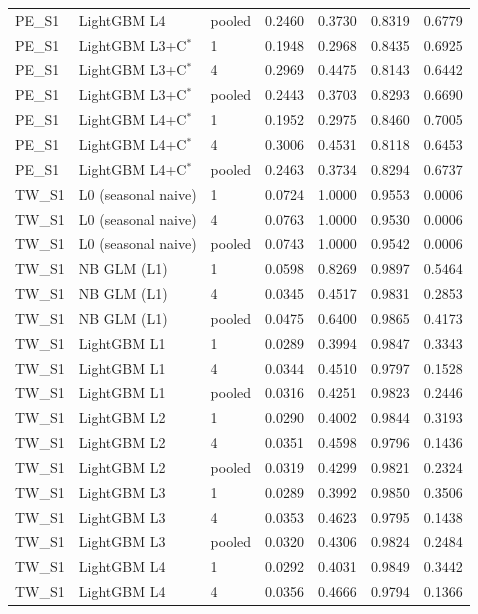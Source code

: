 \begin{tabular}{lllrrrr}
PE\_S1 & LightGBM L4 & pooled & 0.2460 & 0.3730 & 0.8319 & 0.6779 \\
PE\_S1 & LightGBM L3+C$^{*}$ & 1 & 0.1948 & 0.2968 & 0.8435 & 0.6925 \\
PE\_S1 & LightGBM L3+C$^{*}$ & 4 & 0.2969 & 0.4475 & 0.8143 & 0.6442 \\
PE\_S1 & LightGBM L3+C$^{*}$ & pooled & 0.2443 & 0.3703 & 0.8293 & 0.6690 \\
PE\_S1 & LightGBM L4+C$^{*}$ & 1 & 0.1952 & 0.2975 & 0.8460 & 0.7005 \\
PE\_S1 & LightGBM L4+C$^{*}$ & 4 & 0.3006 & 0.4531 & 0.8118 & 0.6453 \\
PE\_S1 & LightGBM L4+C$^{*}$ & pooled & 0.2463 & 0.3734 & 0.8294 & 0.6737 \\
TW\_S1 & L0 (seasonal naive) & 1 & 0.0724 & 1.0000 & 0.9553 & 0.0006 \\
TW\_S1 & L0 (seasonal naive) & 4 & 0.0763 & 1.0000 & 0.9530 & 0.0006 \\
TW\_S1 & L0 (seasonal naive) & pooled & 0.0743 & 1.0000 & 0.9542 & 0.0006 \\
TW\_S1 & NB GLM (L1) & 1 & 0.0598 & 0.8269 & 0.9897 & 0.5464 \\
TW\_S1 & NB GLM (L1) & 4 & 0.0345 & 0.4517 & 0.9831 & 0.2853 \\
TW\_S1 & NB GLM (L1) & pooled & 0.0475 & 0.6400 & 0.9865 & 0.4173 \\
TW\_S1 & LightGBM L1 & 1 & 0.0289 & 0.3994 & 0.9847 & 0.3343 \\
TW\_S1 & LightGBM L1 & 4 & 0.0344 & 0.4510 & 0.9797 & 0.1528 \\
TW\_S1 & LightGBM L1 & pooled & 0.0316 & 0.4251 & 0.9823 & 0.2446 \\
TW\_S1 & LightGBM L2 & 1 & 0.0290 & 0.4002 & 0.9844 & 0.3193 \\
TW\_S1 & LightGBM L2 & 4 & 0.0351 & 0.4598 & 0.9796 & 0.1436 \\
TW\_S1 & LightGBM L2 & pooled & 0.0319 & 0.4299 & 0.9821 & 0.2324 \\
TW\_S1 & LightGBM L3 & 1 & 0.0289 & 0.3992 & 0.9850 & 0.3506 \\
TW\_S1 & LightGBM L3 & 4 & 0.0353 & 0.4623 & 0.9795 & 0.1438 \\
TW\_S1 & LightGBM L3 & pooled & 0.0320 & 0.4306 & 0.9824 & 0.2484 \\
TW\_S1 & LightGBM L4 & 1 & 0.0292 & 0.4031 & 0.9849 & 0.3442 \\
TW\_S1 & LightGBM L4 & 4 & 0.0356 & 0.4666 & 0.9794 & 0.1366 \\

\end{tabular}
